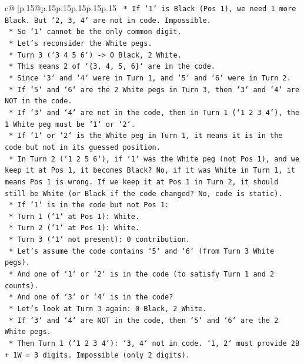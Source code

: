 \documentclass{article}
\begin{document}
{\begin{supertabular}{c@{$\;$}|p{.15\linewidth}@{}p{.15\linewidth}p{.15\linewidth}p{.15\linewidth}p{.15\linewidth}p{.15\linewidth}}
{{{\texttt{        *   If `1` is Black (Pos 1), we need 1 more Black. But `2, 3, 4` are not in code. Impossible.} \\
\texttt{        *   So `1` cannot be the only common digit.} \\
\texttt{    *   Let's reconsider the White pegs.} \\
\texttt{    *   Turn 3 (`3 4 5 6`) {-}> 0 Black, 2 White.} \\
\texttt{        *   This means 2 of `\{3, 4, 5, 6\}` are in the code.} \\
\texttt{        *   Since `3` and `4` were in Turn 1, and `5` and `6` were in Turn 2.} \\
\texttt{        *   If `5` and `6` are the 2 White pegs in Turn 3, then `3` and `4` are NOT in the code.} \\
\texttt{        *   If `3` and `4` are not in the code, then in Turn 1 (`1 2 3 4`), the 1 White peg must be `1` or `2`.} \\
\texttt{        *   If `1` or `2` is the White peg in Turn 1, it means it is in the code but not in its guessed position.} \\
\texttt{        *   In Turn 2 (`1 2 5 6`), if `1` was the White peg (not Pos 1), and we keep it at Pos 1, it becomes Black? No, if it was White in Turn 1, it means Pos 1 is wrong. If we keep it at Pos 1 in Turn 2, it should still be White (or Black if the code changed? No, code is static).} \\
\texttt{        *   If `1` is in the code but not Pos 1:} \\
\texttt{            *   Turn 1 (`1` at Pos 1): White.} \\
\texttt{            *   Turn 2 (`1` at Pos 1): White.} \\
\texttt{            *   Turn 3 (`1` not present): 0 contribution.} \\
\texttt{        *   Let's assume the code contains `5` and `6` (from Turn 3 White pegs).} \\
\texttt{        *   And one of `1` or `2` is in the code (to satisfy Turn 1 and 2 counts).} \\
\texttt{        *   And one of `3` or `4` is in the code?} \\
\texttt{        *   Let's look at Turn 3 again: 0 Black, 2 White.} \\
\texttt{        *   If `3` and `4` are NOT in the code, then `5` and `6` are the 2 White pegs.} \\
\texttt{        *   Then Turn 1 (`1 2 3 4`): `3, 4` not in code. `1, 2` must provide 2B + 1W = 3 digits. Impossible (only 2 digits).} \\
}}}
\end{supertabular}}
\end{document}
